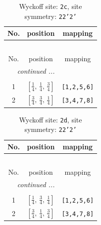 \documentclass[fleqn,8pt]{jsarticle}
\begin{document}
\renewcommand{\arraystretch}{1.2}
\begin{longtable}{ccc}
\caption{Wyckoff site: {\tt 2c}, site symmetry: {\tt 22'2'}}
 \\
 \hline \hline
No. & position & mapping \\ \hline \endfirsthead

\multicolumn{2}{l}{\tablename\ \thetable{}} \\
 \hline \hline
No. & position & mapping \\ \hline \endhead

 \hline \hline
\multicolumn{2}{r}{\footnotesize\it continued ...} \\ \endfoot

 \hline \hline
\multicolumn{2}{r}{} \\ \endlastfoot

1 & $\left[ \frac{1}{4},\, \frac{1}{4},\, \frac{3}{4} \right]$ & {\tt [1,2,5,6]} \\ \hline
2 & $\left[ \frac{3}{4},\, \frac{3}{4},\, \frac{1}{4} \right]$ & {\tt [3,4,7,8]} \\
\end{longtable}
\renewcommand{\arraystretch}{1.2}
\begin{longtable}{ccc}
\caption{Wyckoff site: {\tt 2d}, site symmetry: {\tt 22'2'}}
 \\
 \hline \hline
No. & position & mapping \\ \hline \endfirsthead

\multicolumn{2}{l}{\tablename\ \thetable{}} \\
 \hline \hline
No. & position & mapping \\ \hline \endhead

 \hline \hline
\multicolumn{2}{r}{\footnotesize\it continued ...} \\ \endfoot

 \hline \hline
\multicolumn{2}{r}{} \\ \endlastfoot

1 & $\left[ \frac{1}{4},\, \frac{3}{4},\, \frac{1}{4} \right]$ & {\tt [1,2,5,6]} \\ \hline
2 & $\left[ \frac{3}{4},\, \frac{1}{4},\, \frac{3}{4} \right]$ & {\tt [3,4,7,8]} \\
\end{longtable}
\renewcommand{\arraystretch}{1.2}
\end{document}
